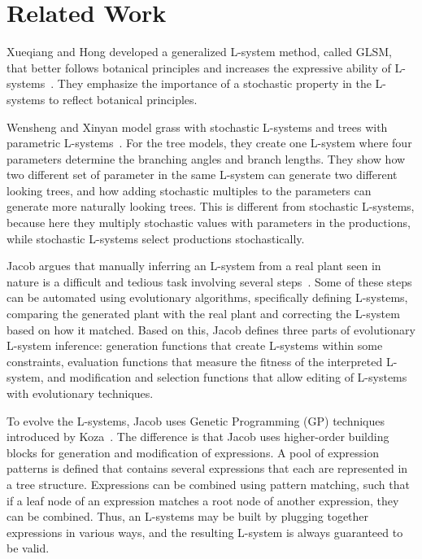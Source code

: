 \chapter{Related Work}
Xueqiang and Hong developed a generalized L-system method, called GLSM, that better follows botanical principles and increases the expressive ability of L-systems~\cite{2012Xueqiang}.
They emphasize the importance of a stochastic property in the L-systems to reflect botanical principles.

Wensheng and Xinyan model grass with stochastic L-systems and trees with parametric L-systems~\cite{2010Wensheng}.
For the tree models, they create one L-system where four parameters determine the branching angles and branch lengths.
They show how two different set of parameter in the same L-system can generate two different looking trees, and how adding stochastic multiples to the parameters can generate more naturally looking trees.
This is different from stochastic L-systems, because here they multiply stochastic values with parameters in the productions, while stochastic L-systems select productions stochastically.

Jacob argues that manually inferring an L-system from a real plant seen in nature is a difficult and tedious task involving several steps~\cite{1994Jacob}.
Some of these steps can be automated using evolutionary algorithms, specifically defining L-systems, comparing the generated plant with the real plant and correcting the L-system based on how it matched.
Based on this, Jacob defines three parts of evolutionary L-system inference: generation functions that create L-systems within some constraints, evaluation functions that measure the fitness of the interpreted L-system, and modification and selection functions that allow editing of L-systems with evolutionary techniques.

To evolve the L-systems, Jacob uses Genetic Programming (GP) techniques introduced by Koza~\cite{1992Koza}.
The difference is that Jacob uses higher-order building blocks for generation and modification of expressions.
A pool of expression patterns is defined that contains several expressions that each are represented in a tree structure.
Expressions can be combined using pattern matching, such that if a leaf node of an expression matches a root node of another expression, they can be combined.
Thus, an L-systems may be built by plugging together expressions in various ways, and the resulting L-system is always guaranteed to be valid.

